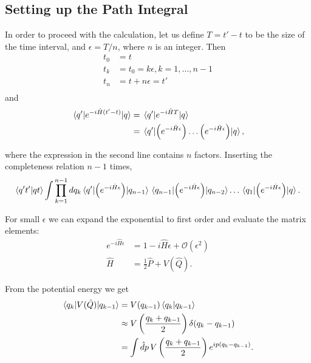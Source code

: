\documentclass{article}
\numberwithin{equation}{section}
\begin{document}
\subsection{Setting up the Path Integral}

In order to proceed with the calculation, let us define $T=t'-t$ to be the size of the time interval, and $\epsilon=T/n$, where $n$ is an integer. Then
\begin{equation}
\begin{aligned}
    t_0 &= t \\
    t_k &= t_0 = k\epsilon, k=1, \dots, n-1 \\
    t_n &= t + n\epsilon = t' \\
\end{aligned}
\end{equation}
and 
\begin{equation}
\begin{aligned}
    \mel{q'}{e^{-i\hat{H}(t'-t)}}{q} &= \mel{q'}{e^{-i\hat{H}T}}{q} \\
    &= \mel{q'}{\left(e^{-i\hat{H}\epsilon}\right) \dots \left(e^{-i\hat{H}\epsilon}\right)}{q},
\end{aligned}
\end{equation}

where the expression in the second line contains $n$ factors. Inserting the completeness relation $n-1$ times,
\begin{equation}
    \braket{q't'}{qt} \int \prod_{k=1}^{n-1} dq_k \mel{q'}{\left(e^{-i\hat{H}\epsilon}\right)}{q_{n-1}} \mel{q_{n-1}}{\left(e^{-i\hat{H}\epsilon}\right)}{q_{n-2}} \dots \mel{q_1}{\left(e^{-i\hat{H}\epsilon}\right)}{q}.
\end{equation}

For small $\epsilon$ we can expand the exponential to first order and evaluate the matrix elements:
\begin{equation}
\begin{aligned}
    e^{-i\hat{H}\epsilon} &= 1 - i \hat{H} \epsilon + \mathcal{O}(\epsilon^2) \\
    \hat{H} &= \frac{1}{2} \hat{P} + V(\hat{Q}).
\end{aligned}
\end{equation}

From the potential energy we get
\begin{equation}
\begin{aligned}
    \mel{q_k}{V(\hat{Q})}{q_{k-1}} &= V(q_{k-1})\braket{q_k}{q_{k-1}} \\
    &\approx V\left(\frac{q_k + q_{k-1}}{2}\right) \delta(q_k - q_{k-1}) \\
    &= \int \hat{d}p \, V\left(\frac{q_k + q_{k-1}}{2}\right) e^{ip(q_k - q_{k-1})}.
\end{aligned}
\end{equation}
\end{document}

